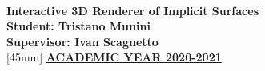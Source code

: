 \documentclass{article}
\begin{document}

\begin{titlepage}
  ~\\
  [50mm]
 	\centering
  \Huge{\textbf{Interactive 3D Renderer of Implicit Surfaces}}\\
 	[50mm]
  \Large{\textbf{
      Student: Tristano Munini \\
  Supervisor: Ivan Scagnetto
  }}\\
 	[45mm]
 	\centering
  \LARGE{\underline{\textbf{ACADEMIC YEAR 2020-2021}}}\\
\end{titlepage}

\tableofcontents
\thispagestyle{empty}
\cleardoublepage
\setcounter{page}{1}






\clearpage

\clearpage


\cleardoublepage
\printbibliography
\end{document}
